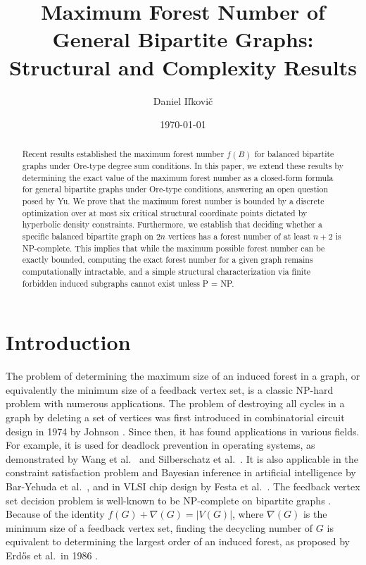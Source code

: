 \documentclass[a4paper]{amsart}
\title{Maximum Forest Number of General Bipartite Graphs: Structural and Complexity Results}
\author{Daniel Iľkovič}
\date{\today}
\begin{document}
\begin{abstract}
Recent results established the maximum forest number $f(B)$ for balanced bipartite graphs under Ore-type degree sum conditions.
In this paper, we extend these results by determining the exact value of the maximum forest number as a closed-form formula for general bipartite graphs under Ore-type conditions, answering an open question posed by Yu.
We prove that the maximum forest number is bounded by a discrete optimization over at most six critical structural coordinate points dictated by hyperbolic density constraints.
Furthermore, we establish that deciding whether a specific balanced bipartite graph on $2n$ vertices has a forest number of at least $n+2$ is NP-complete. This implies that while the maximum possible forest number can be exactly bounded, computing the exact forest number for a given graph remains computationally intractable, and a simple structural characterization via finite forbidden induced subgraphs cannot exist unless P = NP.
\end{abstract}

\maketitle

\section{Introduction}

The problem of determining the maximum size of an induced forest in a graph, or equivalently the minimum size of a feedback vertex set, is a classic NP-hard problem with numerous applications. 
The problem of destroying all cycles in a graph by deleting a set of vertices was first introduced in combinatorial circuit design in 1974 by Johnson \cite{Johnson1974}. 
Since then, it has found applications in various fields.
For example, it is used for deadlock prevention in operating systems, as demonstrated by Wang et al.\ \cite{Wang1985} and Silberschatz et al.\ \cite{Silberschatz2003}.
It is also applicable in the constraint satisfaction problem and Bayesian inference in artificial intelligence by Bar-Yehuda et al.\ \cite{BarYehuda1998}, and in VLSI chip design by Festa et al.\ \cite{Festa2000}.
The feedback vertex set decision problem is well-known to be NP-complete on bipartite graphs \cite{Karp1972}.
Because of the identity $f(G) + \nabla(G) = |V(G)|$, where $\nabla(G)$ is the minimum size of a feedback vertex set, finding the decycling number of $G$ is equivalent to determining the largest order of an induced forest, as proposed by Erd{\H{o}}s et al.\ in 1986 \cite{Erdos1986}.
\end{document}
